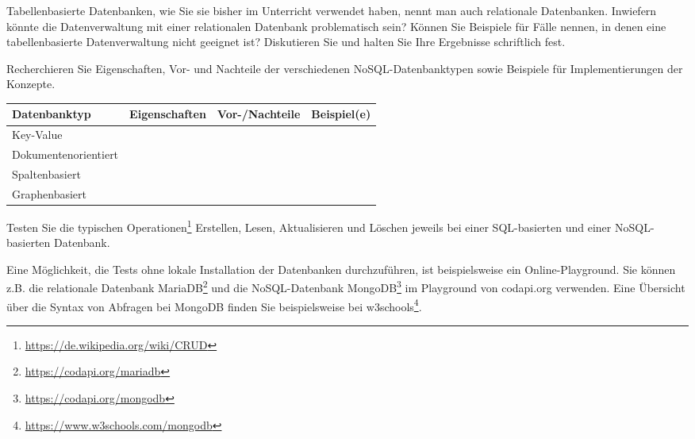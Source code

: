 \documentclass[11pt, a4paper, oneside]{article}
\begin{document}
	
	
	
	Tabellenbasierte Datenbanken, wie Sie sie bisher im Unterricht verwendet haben, nennt man auch relationale Datenbanken.
	Inwiefern könnte die Datenverwaltung mit einer relationalen Datenbank problematisch sein?
	Können Sie Beispiele für Fälle nennen, in denen eine tabellenbasierte Datenverwaltung nicht geeignet ist?
	Diskutieren Sie und halten Sie Ihre Ergebnisse schriftlich fest.
	
	\boxarea[15cm]
	
	\pagebreak
	
	
	Recherchieren Sie Eigenschaften, Vor- und Nachteile der verschiedenen NoSQL-Datenbanktypen sowie Beispiele für Implementierungen der Konzepte.	
	
	\begin{table}[h]
		\renewcommand{\arraystretch}{2}
		\setlength\tabcolsep{.5cm}
		\begin{tabularx}{\textwidth}{|l|X|X|X|}
			\hline
			\textbf{Datenbanktyp} & \textbf{Eigenschaften}& \textbf{Vor-/Nachteile} & \textbf{Beispiel(e)}\\
			\hline
			Key-Value &&&\\[3.4cm]
			\hline
			Dokumentenorientiert &&&\\[3.4cm]
			\hline
			Spaltenbasiert &&&\\[3.4cm]
			\hline
			Graphenbasiert &&&\\[3.4cm]
			\hline
		\end{tabularx}
	\end{table}
	\pagebreak
	
	
	Testen Sie die typischen Operationen\footnote{\url{https://de.wikipedia.org/wiki/CRUD}} Erstellen, Lesen, Aktualisieren und Löschen jeweils bei einer SQL-basierten und einer NoSQL-basierten Datenbank.
	
	Eine Möglichkeit, die Tests ohne lokale Installation der Datenbanken durchzuführen, ist beispielsweise ein Online-Playground.
	Sie können z.B. die relationale Datenbank MariaDB\footnote{\url{https://codapi.org/mariadb}} und die NoSQL-Datenbank MongoDB\footnote{\url{https://codapi.org/mongodb}} im Playground von codapi.org verwenden.
	Eine Übersicht über die Syntax von Abfragen bei MongoDB finden Sie beispielsweise bei w3schools\footnote{\url{https://www.w3schools.com/mongodb}}.
	
\end{document}
